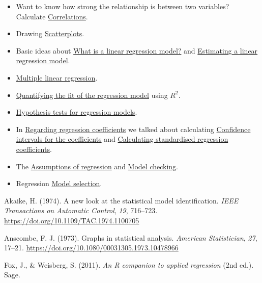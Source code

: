 \documentclass[
  a4paper,
]{book}
\providecommand{\tightlist}{%
  \setlength{\itemsep}{0pt}\setlength{\parskip}{0pt}}\usepackage{longtable,booktabs,array}
\newlength{\cslhangindent}
\newlength{\cslentryspacingunit} %
\newenvironment{CSLReferences}[2] %
 {%
  \setlength{\parindent}{0pt}
  \ifodd #1
  \let\oldpar\par
  \def\par{\hangindent=\cslhangindent\oldpar}
  \fi
  \setlength{\parskip}{#2\cslentryspacingunit}
 }%
 {}
\begin{document}
\begin{itemize}
\tightlist
\item
  Want to know how strong the relationship is between two variables?
  Calculate \protect\hyperlink{correlations}{Correlations}.
\item
  Drawing \protect\hyperlink{scatterplots}{Scatterplots}.
\item
  Basic ideas about
  \protect\hyperlink{what-is-a-linear-regression-model}{What is a linear
  regression model?} and
  \protect\hyperlink{estimating-a-linear-regression-model}{Estimating a
  linear regression model}.
\item
  \protect\hyperlink{multiple-linear-regression}{Multiple linear
  regression}.
\item
  \protect\hyperlink{quantifying-the-fit-of-the-regression-model}{Quantifying
  the fit of the regression model} using \(R^2\).
\item
  \protect\hyperlink{hypothesis-tests-for-regression-models}{Hypothesis
  tests for regression models}.
\item
  In \protect\hyperlink{regarding-regression-coefficients}{Regarding
  regression coefficients} we talked about calculating
  \protect\hyperlink{confidence-intervals-for-the-coefficients}{Confidence
  intervals for the coefficients} and
  \protect\hyperlink{calculating-standardised-regression-coefficients}{Calculating
  standardised regression coefficients}.
\item
  The \protect\hyperlink{assumptions-of-regression}{Assumptions of
  regression} and \protect\hyperlink{sec-Model-checking}{Model
  checking}.
\item
  Regression \protect\hyperlink{model-selection}{Model selection}.
\end{itemize}

\hypertarget{refs}{}
\begin{CSLReferences}{1}{0}
\leavevmode{}%
Akaike, H. (1974). A new look at the statistical model identification.
\emph{IEEE Transactions on Automatic Control}, \emph{19}, 716--723.
\url{https://doi.org/10.1109/TAC.1974.1100705}

\leavevmode{}%
Anscombe, F. J. (1973). Graphs in statistical analysis. \emph{American
Statistician}, \emph{27}, 17--21.
\url{https://doi.org/10.1080/00031305.1973.10478966}

\leavevmode{}%
Fox, J., \& Weisberg, S. (2011). \emph{An {R} companion to applied
regression} (2nd ed.). Sage.

\end{CSLReferences}
\end{document}
